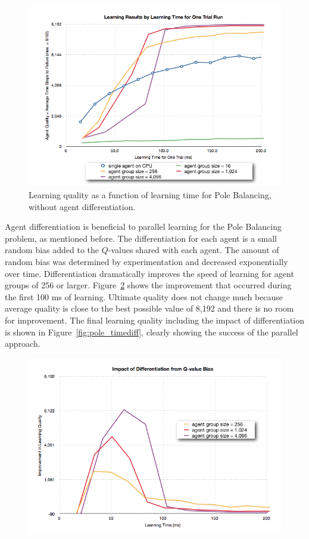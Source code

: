 \documentclass[11pt]{article} %
\begin{document}
\begin{figure}[hbtp]
\center
\includegraphics[scale=0.5]{fig08a}
\caption{Learning quality as a function of learning time for Pole Balancing, without agent differentiation.}
\label{fig:pole_time}
\end{figure}

\begin{flushleft}

Agent differentiation is beneficial to parallel learning for the Pole Balancing problem, as mentioned before.  The differentiation for each agent is a small random bias added to the $Q$-values shared with each agent. The amount of random bias was determined by experimentation and decreased exponentially over time.  Differentiation dramatically improves the speed of learning for agent groups of 256 or larger.  Figure~\ref{fig:pole_diff} shows the improvement that occurred during the first 100 ms of learning.  Ultimate quality does not change much because average quality is close to the best possible value of 8,192 and there is no room for improvement.  The final learning quality including the impact of differentiation is shown in Figure~\ref{fig:pole_timediff}, clearly showing the success of the parallel approach.

\end{flushleft}

\begin{figure}[hbtp]
\center
\includegraphics[scale=0.5]{fig09a}
\caption{}
\label{fig:pole_diff}
\end{figure}
\end{document}
